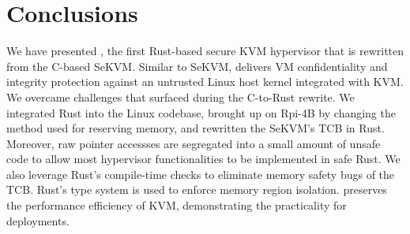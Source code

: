 
\chapter{Conclusions}
\label{sec:conclusions}

We have presented \rustsec{}, the first Rust-based secure KVM hypervisor that
is rewritten from the C-based SeKVM.
Similar to SeKVM, \rustsec{} delivers VM confidentiality and integrity
protection against an untrusted Linux host kernel integrated with KVM.
We overcame challenges that surfaced during the C-to-Rust rewrite. We
integrated Rust into the Linux codebase, brought up \rustsec{} on Rpi-4B by
changing the method used for reserving memory, and rewritten the SeKVM's TCB in
Rust. Moreover, raw pointer accessses are segregated into a small amount of
unsafe code to allow most hypervisor functionalities to be implemented in safe
Rust. We also leverage Rust's compile-time checks to eliminate memory safety
bugs of the TCB. Rust's type system is used to enforce memory region isolation.
\rustsec{} preserves the performance efficiency of KVM, demonstrating the
practicality for deployments.


